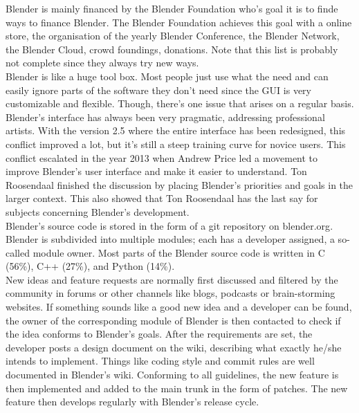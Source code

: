 Blender is mainly financed by the Blender Foundation who's goal it is to finde ways to finance Blender. The Blender Foundation achieves this goal with a online store\cite{blender-estore}, the organisation of the yearly Blender Conference\cite{blender-conference}, the Blender Network\cite{blender-network}, the Blender Cloud\cite{blender-cloud}, crowd foundings, donations\cite{blender-donate}. Note that this list is probably not complete since they always try new ways. \\

Blender is like a huge tool box. Most people just use what the need and can easily ignore parts of the software they don't need since the GUI is very customizable and flexible. Though, there's one issue that arises on a regular basis. Blender's interface has always been very pragmatic, addressing professional artists. With the version 2.5 where the entire interface has been redesigned, this conflict improved a lot, but it's still a steep training curve for novice users. This conflict escalated in the year 2013 when Andrew Price led a movement to improve Blender's user interface and make it easier to understand.\cite{blender-guru-ui} Ton Roosendaal finished the discussion by placing Blender's priorities and goals in the larger context.\cite{blender-ton-ui} This also showed that Ton Roosendaal has the last say for subjects concerning Blender's development. \\

Blender's source code is stored in the form of a git repository on blender.org\cite{blender-repository}. Blender is subdivided into multiple modules; each has a developer assigned, a so-called module owner.\cite{blender-module-owners} Most parts of the Blender source code is written in C (56\%), C++ (27\%), and Python (14\%).\cite{blender-code-stat} \\

New ideas and feature requests are normally first discussed and filtered by the community in forums or other channels like blogs, podcasts or brain-storming websites.\cite{blender-community} If something sounds like a good new idea and a developer can be found, the owner of the corresponding module of Blender is then contacted to check if the idea conforms to Blender's goals. After the requirements are set, the developer posts a design document on the wiki, describing what exactly he/she intends to implement.\cite{blender-new-devs} Things like coding style\cite{blender-style-rules} and commit rules\cite{blender-new-devs} are well documented in Blender's wiki. Conforming to all guidelines, the new feature is then implemented and added to the main trunk in the form of patches. The new feature then develops regularly with Blender's release cycle.

